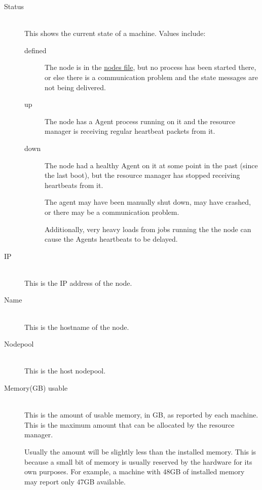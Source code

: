    \begin{description}
      \item[Status] \hfill \\
        This shows the current state of a machine.  Values include:
        \begin{description}
          \item[defined] The node is in the {\DUCC}
            \hyperref[sec:admin-ducc.nodes]{nodes file}, but no {\DUCC} process has been
            started there, or else there is a communication problem and
            the state messages are not being delivered.
            \item[up] The node has a {\DUCC} Agent process running on it and the
              resource manager is receiving regular heartbeat packets from it.
            \item[down] The node had a healthy {\DUCC} Agent on it at some point
              in the past (since the last {\DUCC} boot), but the resource manager
              has stopped receiving heartbeats from it. 

              The agent may have been manually shut down, may have crashed, or there
              may be a communication problem.

              Additionally, very heavy loads from jobs running the the node can cause
              the {\DUCC} Agents heartbeats to be delayed.
        \end{description}

      \item[IP] \hfill \\
        This is the IP address of the node.


      \item[Name] \hfill \\
        This is the hostname of the node.

      \item[Nodepool] \hfill \\
        This is the host nodepool.

      \item[Memory(GB) usable] \hfill \\
        This is the amount of usable memory, in GB, as reported by each machine.  
        This is the maximum amount that can be allocated by the resource manager.
        
        Usually the amount will be slightly less than the installed memory.  This is because
        a small bit of memory is usually reserved by the hardware for its own purposes.  For 
        example, a machine with 48GB of installed memory may report only 47GB available.


\end{description}
